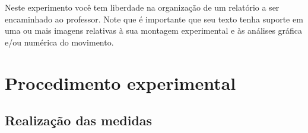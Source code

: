 Neste experimento você tem liberdade na organização de um relatório a ser encaminhado ao professor. Note que é importante que seu texto tenha suporte em uma ou mais imagens relativas à sua montagem experimental e às análises gráfica e/ou numérica do movimento.








\section{Procedimento experimental}

\subsection{Realização das medidas}

